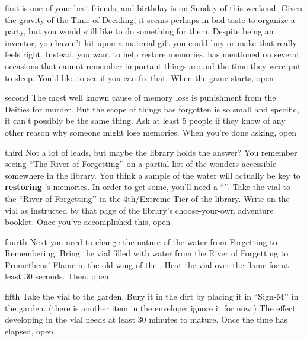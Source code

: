 \documentclass[notebook]{GL2020} %
\begin{document}
\startnotebook{\nRestoreMemories{}}

\begin{page}{first}
\cDisney{} is one of your best friends, and \cDisney{\their} birthday is on Sunday of this weekend. Given the gravity of the Time of Deciding, it seems perhaps in bad taste to organize a party, but you would still like to do something for them. Despite being an inventor, you haven’t hit upon a material gift you could buy or make that really feels right. Instead, you want to help \cDisney{} restore \cDisney{\their} memories. \cDisney{} has mentioned on several occasions that \cDisney{\they} cannot remember important things around the time they were put to sleep. You’d like to see if you can fix that. When the game starts, open 
\end{page}

\begin{page}{second}
The most well known cause of memory loss is punishment from the Deities for murder. But the scope of things \cDisney{} has forgotten is so small and specific, it can’t possibly be the same thing. Ask at least 5 people if they know of any other reason why someone might lose memories. When you’re done asking, open 
\end{page}

\begin{page}{third}
Not a lot of leads, but maybe the library holds the answer? You remember seeing ``The River of Forgetting’’ on a partial list of the wonders accessible somewhere in the library. You think a sample of the water will actually be key to \textbf{restoring} \cDisney{}’s memories. In order to get some, you’ll need a ``\iGlassVial{}’’. Take the vial to the ``River of Forgetting’’ in the 4th/Extreme Tier of the library. Write on the vial as instructed by that page of the library’s choose-your-own adventure booklet. Once you’ve accomplished this, open 
\end{page}

\begin{page}{fourth}
Next you need to change the nature of the water from Forgetting to Remembering. Bring the vial filled with water from the River of Forgetting to Prometheus’ Flame in the old wing of the \pSc{}. Heat the vial over the flame for at least 30 seconds. Then, open 
\end{page}

\begin{page}{fifth}
Take the vial to the garden. Bury it in the dirt by placing it in ``Sign-M’’ in the garden. (there is another item in the envelope; ignore it for now.) The effect developing in the vial needs at least 30 minutes to mature. Once the time has elapsed, open 
\end{page}
\end{document}
